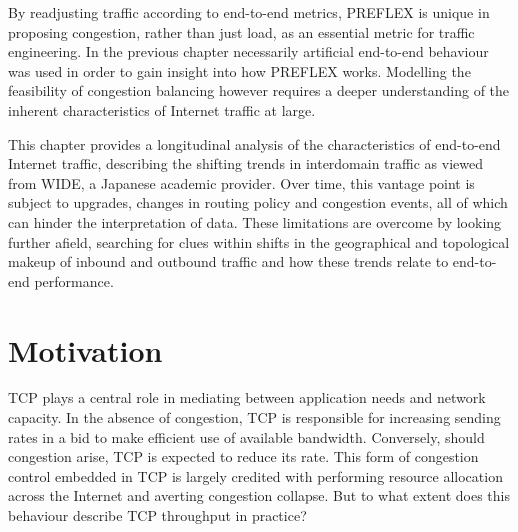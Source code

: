 By readjusting traffic according to end-to-end metrics, \ac{PREFLEX} is unique in proposing congestion, rather than just load, as an essential metric for traffic engineering.
In the previous chapter necessarily artificial end-to-end behaviour was used in order to gain insight into how \ac{PREFLEX} works.
Modelling the feasibility of congestion balancing however requires a deeper understanding of the inherent characteristics of Internet traffic at large.

This chapter provides a longitudinal analysis of the characteristics of end-to-end Internet traffic, describing the shifting trends in interdomain traffic as viewed from \acs{WIDE}, a Japanese academic provider.
Over time, this vantage point is subject to upgrades, changes in routing policy and congestion events, all of which can hinder the interpretation of data.
These limitations are overcome by looking further afield, searching for clues within shifts in the geographical and topological makeup of inbound and outbound traffic and how these trends relate to end-to-end performance.

\section{Motivation}

\ac{TCP} plays a central role in mediating between application needs and network capacity.
In the absence of congestion, \ac{TCP} is responsible for increasing sending rates in a bid to make efficient use of available bandwidth.
Conversely, should congestion arise, \ac{TCP} is expected to reduce its rate.
This form of congestion control embedded in \ac{TCP} is largely credited with performing resource allocation across the Internet and averting congestion collapse.
But to what extent does this behaviour describe \ac{TCP} throughput in practice?


